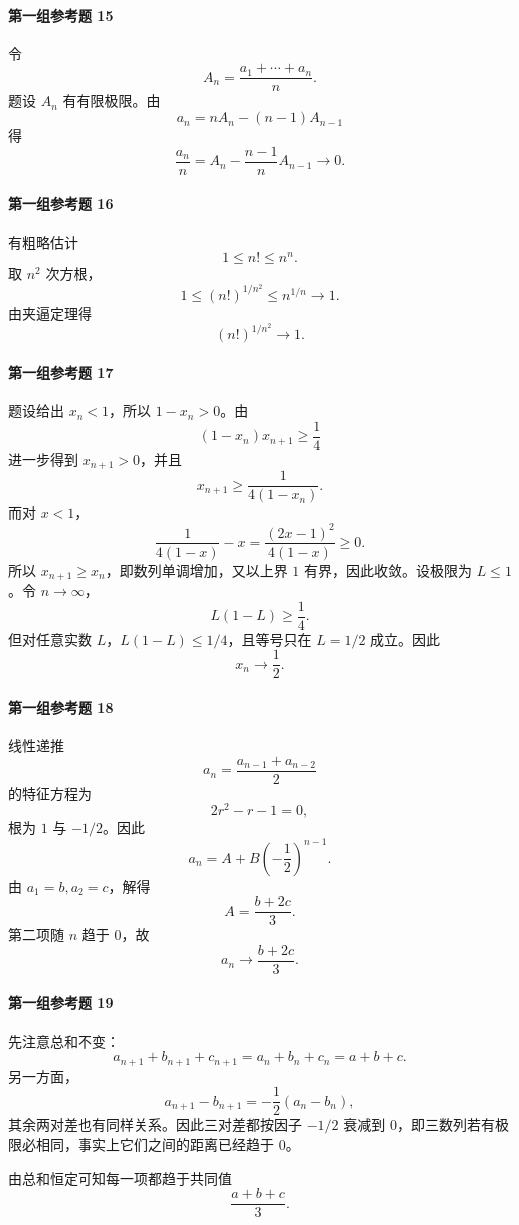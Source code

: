 \paragraph{第一组参考题 15}
\begin{xsolution}
令
\[
  A_n=\frac{a_1+\cdots+a_n}{n}.
\]
题设 $A_n$ 有有限极限。由
\[
  a_n=nA_n-(n-1)A_{n-1}
\]
得
\[
  \frac{a_n}{n}=A_n-\frac{n-1}{n}A_{n-1}\to0.
\]
\end{xsolution}

\paragraph{第一组参考题 16}
\begin{xsolution}
有粗略估计
\[
  1\le n!\le n^n.
\]
取 $n^2$ 次方根，
\[
  1\le(n!)^{1/n^2}\le n^{1/n}\to1.
\]
由夹逼定理得
\[
  \boxed{(n!)^{1/n^2}\to1}.
\]
\end{xsolution}

\paragraph{第一组参考题 17}
\begin{xsolution}
题设给出 $x_n<1$，所以 $1-x_n>0$。由
\[
  (1-x_n)x_{n+1}\ge\frac14
\]
进一步得到 $x_{n+1}>0$，并且
\[
  x_{n+1}\ge\frac1{4(1-x_n)}.
\]
而对 $x<1$，
\[
  \frac1{4(1-x)}-x
  =\frac{(2x-1)^2}{4(1-x)}\ge0.
\]
所以 $x_{n+1}\ge x_n$，即数列单调增加，又以上界 $1$ 有界，因此收敛。设极限为 $L\le1$。令 $n\to\infty$，
\[
  L(1-L)\ge\frac14.
\]
但对任意实数 $L$，$L(1-L)\le1/4$，且等号只在 $L=1/2$ 成立。因此
\[
  \boxed{x_n\to\frac12}.
\]
\end{xsolution}

\paragraph{第一组参考题 18}
\begin{xsolution}
线性递推
\[
  a_n=\frac{a_{n-1}+a_{n-2}}2
\]
的特征方程为
\[
  2r^2-r-1=0,
\]
根为 $1$ 与 $-1/2$。因此
\[
  a_n=A+B\left(-\frac12\right)^{n-1}.
\]
由 $a_1=b,a_2=c$，解得
\[
  A=\frac{b+2c}{3}.
\]
第二项随 $n$ 趋于 $0$，故
\[
  \boxed{a_n\to\frac{b+2c}{3}}.
\]
\end{xsolution}

\paragraph{第一组参考题 19}
\begin{xsolution}
先注意总和不变：
\[
  a_{n+1}+b_{n+1}+c_{n+1}=a_n+b_n+c_n=a+b+c.
\]
另一方面，
\[
  a_{n+1}-b_{n+1}=-\frac12(a_n-b_n),
\]
其余两对差也有同样关系。因此三对差都按因子 $-1/2$ 衰减到 $0$，即三数列若有极限必相同，事实上它们之间的距离已经趋于 $0$。

由总和恒定可知每一项都趋于共同值
\[
  \boxed{\frac{a+b+c}{3}}.
\]
\end{xsolution}

